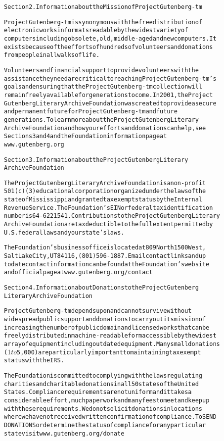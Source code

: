 \documentclass[12pt]{book}[2005/09/16]
\newenvironment{PGtext}{%
\begin{alltt}
\fontsize{9.2}{10.5}\ttfamily\selectfont}%
{\end{alltt}}
\begin{document}
\begin{PGtext}
Section 2. Information about the Mission of Project Gutenberg-tm

Project Gutenberg-tm is synonymous with the free distribution of
electronic works in formats readable by the widest variety of
computers including obsolete, old, middle-aged and new computers. It
exists because of the efforts of hundreds of volunteers and donations
from people in all walks of life.

Volunteers and financial support to provide volunteers with the
assistance they need are critical to reaching Project Gutenberg-tm's
goals and ensuring that the Project Gutenberg-tm collection will
remain freely available for generations to come. In 2001, the Project
Gutenberg Literary Archive Foundation was created to provide a secure
and permanent future for Project Gutenberg-tm and future
generations. To learn more about the Project Gutenberg Literary
Archive Foundation and how your efforts and donations can help, see
Sections 3 and 4 and the Foundation information page at
www.gutenberg.org

Section 3. Information about the Project Gutenberg Literary
Archive Foundation

The Project Gutenberg Literary Archive Foundation is a non-profit
501(c)(3) educational corporation organized under the laws of the
state of Mississippi and granted tax exempt status by the Internal
Revenue Service. The Foundation's EIN or federal tax identification
number is 64-6221541. Contributions to the Project Gutenberg Literary
Archive Foundation are tax deductible to the full extent permitted by
U.S. federal laws and your state's laws.

The Foundation's business office is located at 809 North 1500 West,
Salt Lake City, UT 84116, (801) 596-1887. Email contact links and up
to date contact information can be found at the Foundation's website
and official page at www.gutenberg.org/contact

Section 4. Information about Donations to the Project Gutenberg
Literary Archive Foundation

Project Gutenberg-tm depends upon and cannot survive without
widespread public support and donations to carry out its mission of
increasing the number of public domain and licensed works that can be
freely distributed in machine-readable form accessible by the widest
array of equipment including outdated equipment. Many small donations
($1 to $5,000) are particularly important to maintaining tax exempt
status with the IRS.

The Foundation is committed to complying with the laws regulating
charities and charitable donations in all 50 states of the United
States. Compliance requirements are not uniform and it takes a
considerable effort, much paperwork and many fees to meet and keep up
with these requirements. We do not solicit donations in locations
where we have not received written confirmation of compliance. To SEND
DONATIONS or determine the status of compliance for any particular
state visit www.gutenberg.org/donate


\end{PGtext}
\end{document}
